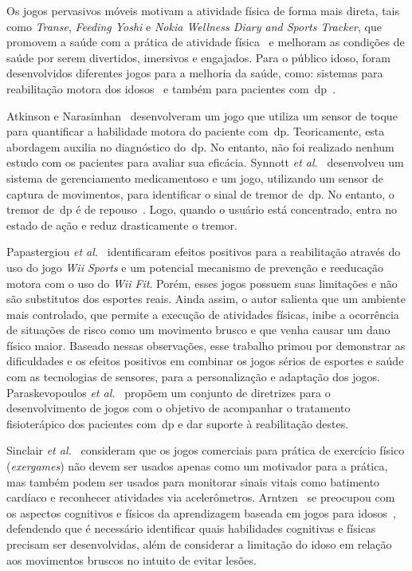 Os jogos pervasivos móveis motivam a atividade física de forma mais direta, tais como \textit{Transe}, \textit{Feeding Yoshi} e  \textit{Nokia Wellness Diary and Sports Tracker}, que promovem a saúde com a prática de atividade física~\cite{Suhonen:2008:SFE:1457199.1457204} e melhoram as condições de saúde por serem divertidos, imersivos e engajados. Para o público idoso, foram desenvolvidos diferentes jogos para a melhoria da saúde, como: sistemas para reabilitação motora dos idosos~\cite{brox11} e também para pacientes com~\ac{dp}~\cite{atkinson2010,synnott_wiipd_2012,sacbespoke2014}. 

Atkinson e Narasimhan~\cite{atkinson2010} desenvolveram um jogo que utiliza um sensor de toque para quantificar a habilidade motora do paciente com~\ac{dp}. Teoricamente, esta abordagem auxilia no diagnóstico do~\ac{dp}. No entanto, não foi realizado nenhum estudo com os pacientes para avaliar sua eficácia. Synnott \textit{et al.}~\cite{synnott_wiipd_2012} desenvolveu um sistema de gerenciamento medicamentoso e um jogo, utilizando um sensor de captura de movimentos, para identificar o sinal de tremor de~\ac{dp}. No entanto, o tremor de~\ac{dp} é de repouso~\cite{national2006parkinson}. Logo, quando o usuário está concentrado, entra no estado de ação e reduz drasticamente o tremor.

Papastergiou \textit{et al.}~\cite{Papastergiou:2009:EPC:1570538.1570707} identificaram efeitos positivos para a reabilitação através do uso do jogo \textit{Wii Sports} e um potencial mecanismo de prevenção e reeducação motora com o uso do \textit{Wii Fit}. Porém, esses jogos possuem suas limitações e não são substitutos dos esportes reais. Ainda assim, o autor salienta que um ambiente mais controlado, que permite a execução de atividades físicas, inibe a ocorrência de situações de risco como um movimento brusco e que venha causar um dano físico maior. Baseado nessas observações, esse trabalho primou por demonstrar as dificuldades e os efeitos positivos em combinar os jogos sérios de esportes e saúde com as tecnologias de sensores, para a personalização e adaptação dos jogos. Paraskevopoulos \textit{et al.}~\cite{sacbespoke2014} propõem um conjunto de diretrizes para o desenvolvimento de jogos com o objetivo de acompanhar o tratamento fisioterápico dos pacientes com~\ac{dp} e dar suporte à reabilitação 
destes.

Sinclair \textit{et al.}~\cite{Sinclair:2009:UVB:1515604.1515617} consideram que os jogos comerciais para prática de exercício físico (\textit{exergames}) não devem ser usados apenas como um motivador para a prática, mas também podem ser usados para monitorar sinais vitais como batimento cardíaco e reconhecer atividades via acelerômetros. Arntzen~\cite{arntzen2011} se preocupou com os aspectos cognitivos e físicos da aprendizagem baseada em jogos para idosos~\cite{arntzen2011}, defendendo que é necessário identificar quais habilidades cognitivas e físicas precisam ser desenvolvidas, além de considerar a limitação do idoso em relação aos movimentos bruscos no intuito de evitar lesões.

